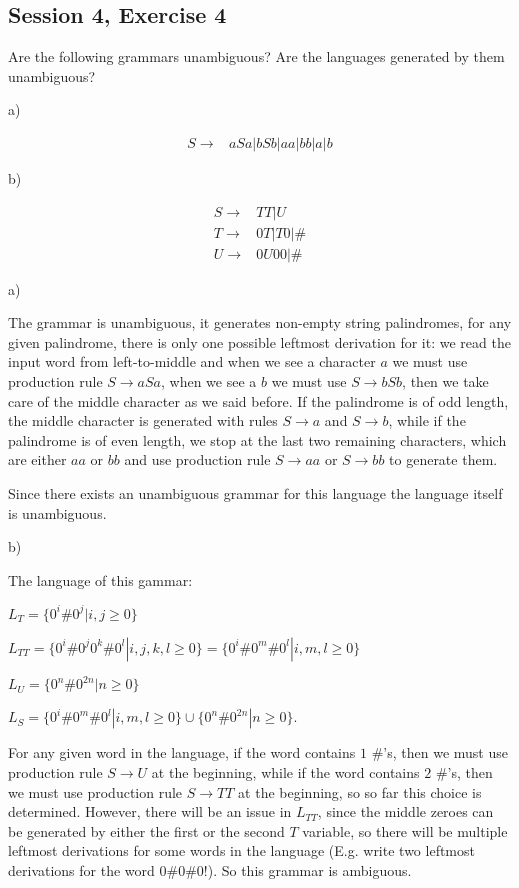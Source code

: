 \subsection{Session 4, Exercise 4}


Are the following grammars unambiguous? Are the languages generated by them unambiguous?

a)

\begin{align*}
S \rightarrow& aSa|bSb|aa|bb|a|b
\end{align*}

b)

\begin{align*}
S \rightarrow& TT|U \\
T \rightarrow& 0T|T0|\# \\
U \rightarrow& 0U00|\#
\end{align*}


a)

The grammar is unambiguous, it generates non-empty string palindromes, for any given palindrome, there is only one possible leftmost derivation for it: we read the input word from left-to-middle and when we see a character $a$ we must use production rule $S \rightarrow aSa$, when we see a $b$ we must use $S \rightarrow bSb$, then we take care of the middle character as we said before. If the palindrome is of odd length, the middle character is generated with rules $S \rightarrow a$ and $S \rightarrow b$, while if the palindrome is of even length, we stop at the last two remaining characters, which are either $aa$ or $bb$ and use production rule $S\rightarrow aa$ or $S\rightarrow bb$ to generate them. 

Since there exists an unambiguous grammar for this language the language itself is unambiguous.

b)

The language of this gammar:

$L_T = \{0^i\#0^j | i,j \geq{} 0\}$

$L_{TT} = \{0^i\#0^j0^k\#0^l | i,j,k,l \geq{} 0\} = \{0^i\#0^m\#0^l | i,m,l \geq{} 0\}$

$L_U = \{0^n\#0^{2n} | n\geq{} 0\}$

$L_S = \{0^i\#0^m\#0^l | i,m,l \geq{} 0\} \cup{} \{0^n\#0^{2n} | n\geq{} 0\}$.

For any given word in the language, if the word contains $1$ $\#$'s, then we must use production rule $S \rightarrow U$ at the beginning, while if the word contains $2$ $\#$'s, then we must use production rule $S \rightarrow TT$ at the beginning, so so far this choice is determined. However, there will be an issue in $L_{TT}$, since the middle zeroes can be generated by either the first or the second $T$ variable, so there will be multiple leftmost derivations for some words in the language (E.g. write two leftmost derivations for the word $0\#0\#0$!). So this grammar is ambiguous.

